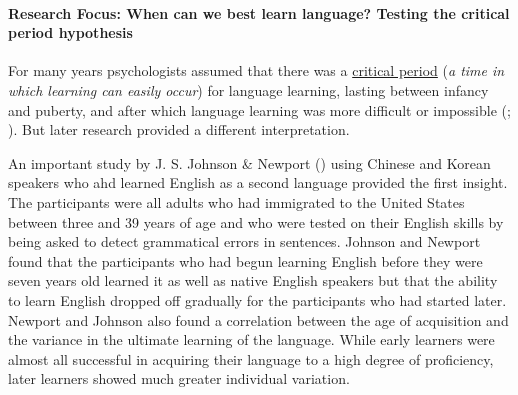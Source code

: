 \documentclass[
]{krantz}
\begin{document}
\paragraph*{Research Focus: When can we best learn language? Testing the critical period hypothesis}\label{research-focus-when-can-we-best-learn-language-testing-the-critical-period-hypothesis}

For many years psychologists assumed that there was a \hyperref[critical-period]{critical period} (\emph{a time in which learning can easily occur}) for language learning, lasting between infancy and puberty, and after which language learning was more difficult or impossible (; ). But later research provided a different interpretation.

An important study by J. S. Johnson \& Newport () using Chinese and Korean speakers who ahd learned English as a second language provided the first insight. The participants were all adults who had immigrated to the United States between three and 39 years of age and who were tested on their English skills by being asked to detect grammatical errors in sentences. Johnson and Newport found that the participants who had begun learning English before they were seven years old learned it as well as native English speakers but that the ability to learn English dropped off gradually for the participants who had started later. Newport and Johnson also found a correlation between the age of acquisition and the variance in the ultimate learning of the language. While early learners were almost all successful in acquiring their language to a high degree of proficiency, later learners showed much greater individual variation.
\end{document}
